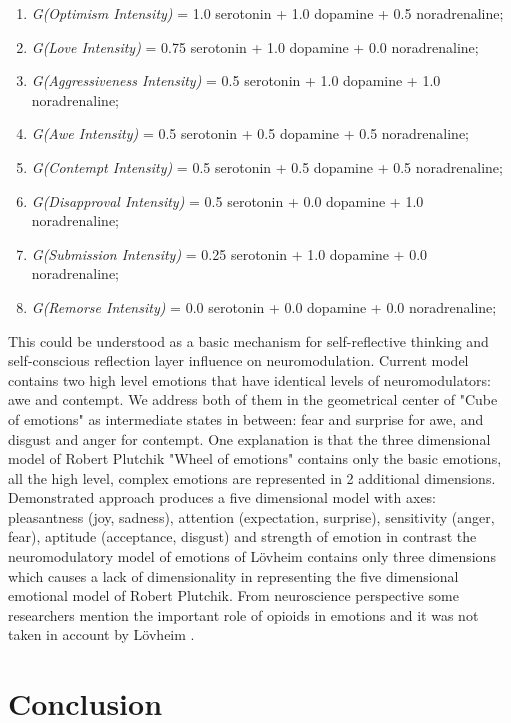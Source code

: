 \begin{enumerate}
 \item  \emph{G(Optimism Intensity)} = 1.0 serotonin  + 1.0 dopamine + 0.5 noradrenaline;
 \item  \emph{G(Love Intensity)} = 0.75 serotonin + 1.0 dopamine + 0.0 noradrenaline;
 \item  \emph{G(Aggressiveness Intensity)} = 0.5 serotonin + 1.0 dopamine + 1.0 noradrenaline;
 \item  \emph{G(Awe Intensity)} = 0.5 serotonin + 0.5 dopamine + 0.5 noradrenaline;
 \item  \emph{G(Contempt Intensity)} = 0.5 serotonin + 0.5 dopamine + 0.5 noradrenaline;
 \item  \emph{G(Disapproval Intensity)} = 0.5 serotonin + 0.0 dopamine + 1.0 noradrenaline;
 \item  \emph{G(Submission Intensity)} = 0.25 serotonin + 1.0 dopamine + 0.0 noradrenaline;
 \item  \emph{G(Remorse Intensity)} = 0.0 serotonin + 0.0 dopamine + 0.0 noradrenaline;
\end{enumerate}

This could be understood as a basic mechanism for self-reflective thinking and self-conscious reflection layer influence on neuromodulation. Current model contains two high level emotions that have identical levels of neuromodulators: awe and contempt. We address both of them in the geometrical center of "Cube of emotions" \cite{cubeofemotions} as intermediate states in between: fear and surprise for awe, and disgust and anger for contempt. One explanation is that the three dimensional model of Robert Plutchik "Wheel of emotions" contains only the basic emotions, all the high level, complex emotions are represented in 2 additional dimensions. Demonstrated approach produces a five dimensional model with axes: pleasantness (joy, sadness), attention (expectation, surprise), sensitivity (anger, fear), aptitude (acceptance, disgust) and strength of emotion \cite{senticcomputing} in contrast the neuromodulatory model of emotions of L\"{o}vheim contains only three dimensions which causes a lack of dimensionality in representing the five dimensional emotional model of Robert Plutchik. From neuroscience perspective some researchers mention the important role of opioids in emotions and it was not taken in account by L\"{o}vheim \cite{emotionsbraintorobot}.

\section{Conclusion}


